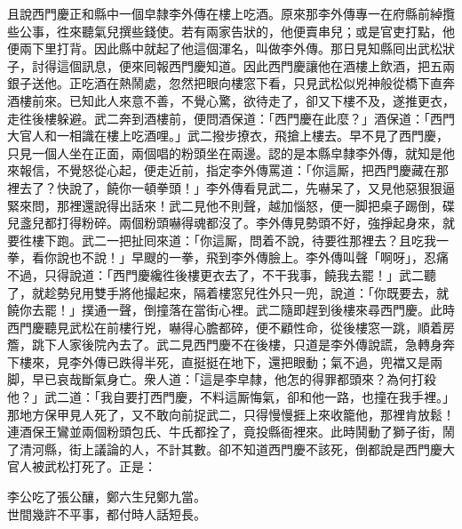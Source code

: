 且說西門慶正和縣中一個皁隸李外傳在樓上吃酒。原來那李外傳專一在府縣前綽攬些公事，徃來聽氣兒撰些錢使。若有兩家告狀的，他便賣串兒；或是官吏打點，他便兩下里打背。因此縣中就起了他這個渾名，叫做李外傳。那日見知縣囘出武松狀子，討得這個訊息，便來囘報西門慶知道。因此西門慶讓他在酒樓上飲酒，把五兩銀子送他。正吃酒在熱鬧處，忽然把眼向樓窓下看，只見武松似兇神般從橋下直奔酒樓前來。已知此人來意不善，不覺心驚，欲待走了，卻又下樓不及，遂推更衣，走徃後樓躲避。武二奔到酒樓前，便問酒保道：「西門慶在此麼？」酒保道：「西門大官人和一相識在樓上吃酒哩。」武二撥步撩衣，飛搶上樓去。早不見了西門慶，只見一個人坐在正面，兩個唱的粉頭坐在兩邊。{}認的是本縣皁隸李外傳，就知是他來報信，不覺怒從心起，便走近前，指定李外傳罵道：「你這厮，把西門慶藏在那裡去了？快說了，饒你一頓拳頭！」李外傳看見武二，先嚇呆了，又見他惡狠狠逼緊來問，那裡還說得出話來！武二見他不則聲，越加惱怒，便一脚把桌子踢倒，碟兒盞兒都打得粉碎。兩個粉頭嚇得魂都沒了。李外傳見勢頭不好，強掙起身來，就要徃樓下跑。武二一把扯囘來道：「你這厮，問着不說，待要徃那裡去？且吃我一拳，看你說也不說！」早颼的一拳，飛到李外傳臉上。李外傳叫聲「啊呀」，忍痛不過，只得說道：「西門慶纔徃後樓更衣去了，不干我事，饒我去罷！」武二聽了，就趁勢兒用雙手將他撮起來，隔着樓窓兒徃外只一兜，說道：「你既要去，就饒你去罷！」撲通一聲，倒撞落在當街心裡。武二隨即趕到後樓來尋西門慶。此時西門慶聽見武松在前樓行兇，嚇得心膽都碎，便不顧性命，從後樓窓一跳，順着房簷，跳下人家後院內去了。武二見西門慶不在後樓，只道是李外傳說謊，急轉身奔下樓來，見李外傳已跌得半死，直挺挺在地下，還把眼動；氣不過，兜襠又是兩脚，早已哀哉斷氣身亡。衆人道：「這是李皁隸，他怎的得罪都頭來？為何打殺他？」武二道：「我自要打西門慶，不料這厮悔氣，卻和他一路，也撞在我手裡。」那地方保甲見人死了，又不敢向前捉武二，只得慢慢捱上來收籠他，那裡肯放鬆！連酒保王鸞並兩個粉頭包氏、牛氏都拴了，竟投縣衙裡來。此時鬨動了獅子街，鬧了清河縣，街上議論的人，不計其數。卻不知道西門慶不該死，倒都說是西門慶大官人被武松打死了。{}正是：

\begin{myquote}
李公吃了張公釀，鄭六生兒鄭九當。\\世間幾許不平事，都付時人話短長。
\end{myquote}

 

